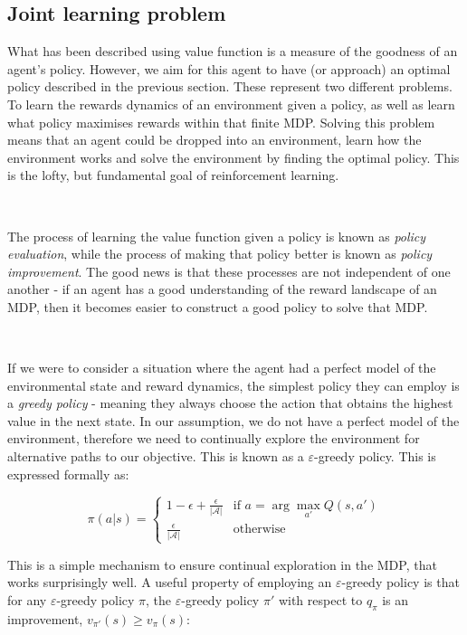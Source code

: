 \documentclass{article}
\begin{document}
\subsection{Joint learning problem}

What has been described using value function is a measure of the goodness of an agent's policy. However, we aim for this agent to have (or approach) an optimal policy described in the previous section. These represent two different problems. To learn the rewards dynamics of an environment given a policy, as well as learn what policy maximises rewards within that finite MDP. Solving this problem means that an agent could be dropped into an environment, learn how the environment works and solve the environment by finding the optimal policy. \citep{silver2015rl} This is the lofty, but fundamental goal of reinforcement learning.

\

The process of learning the value function given a policy is known as \textit{policy evaluation}, while the process of making that policy better is known as \textit{policy improvement}. The good news is that these processes are not independent of one another - if an agent has a good understanding of the reward landscape of an MDP, then it becomes easier to construct a good policy to solve that MDP. \citep{silver2015rl}

\

If we were to consider a situation where the agent had a perfect model of the environmental state and reward dynamics, the simplest policy they can employ is a \textit{greedy policy} - meaning they always choose the action that obtains the highest value in the next state. In our assumption, we do not have a perfect model of the environment, therefore we need to continually explore the environment for alternative paths to our objective. This is known as a $\varepsilon$-greedy policy. This is expressed formally as:

\begin{equation}
	\pi(a | s) = \begin{cases}
		1 - \epsilon + \frac{\epsilon}{|\mathcal{A}|} & \text{if } a = \arg \max_{a'} Q(s, a') \\
		\frac{\epsilon}{|\mathcal{A}|} & \text{otherwise}
	\end{cases}
\end{equation}

This is a simple mechanism to ensure continual exploration in the MDP, that works surprisingly well. A useful property of employing an $\varepsilon$-greedy policy is that for any $\varepsilon$-greedy policy $\pi$, the $\varepsilon$-greedy policy $\pi'$ with respect to $q_\pi$ is an improvement, $v_{\pi'}(s) \geq v_\pi(s)$:
\end{document}

